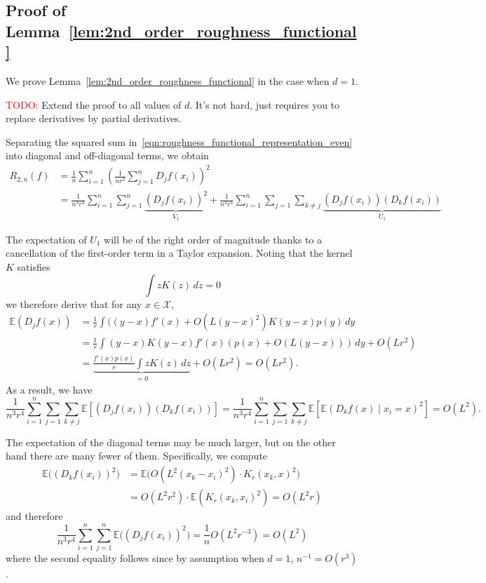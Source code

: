 \documentclass{article}
\newcommand{\1}{\mathbf{1}}
\newcommand{\Ebb}{\mathbb{E}}
\theoremstyle{alden}
\theoremstyle{aldenthm}
\theoremstyle{definition}
\theoremstyle{remark}
\begin{document}
\subsection{Proof of Lemma~\ref{lem:2nd_order_roughness_functional}}
We prove Lemma~\ref{lem:2nd_order_roughness_functional} in the case when $d = 1$.

\textcolor{red}{TODO:} Extend the proof to all values of $d$. It's not hard, just requires you to replace derivatives by partial derivatives.

Separating the squared sum in~\eqref{eqn:roughness_functional_representation_even} into diagonal and off-diagonal terms, we obtain
\begin{align*}
R_{2,n}(f) & = \frac{1}{n}\sum_{i = 1}^{n}\left(\frac{1}{nr^2}\sum_{j = 1}^{n} D_jf(x_i)\right)^2 \\
& = \frac{1}{n^3r^4}\sum_{i = 1}^{n} \sum_{j = 1}^{n}\underbrace{(D_jf(x_i))^2}_{V_1} + \frac{1}{n^3r^4}\sum_{i = 1}^{n} \sum_{j = 1} \sum_{k \neq j}\underbrace{(D_jf(x_i))(D_kf(x_i))}_{U_1}
\end{align*}

The expectation of $U_1$ will be of the right order of magnitude thanks to a cancellation of the first-order term in a Taylor expansion. Noting that the kernel $K$ satisfies
\begin{equation*}
\int z K(z) \,dz = 0
\end{equation*}
we therefore derive that for any $x \in \mathcal{X}$,
\begin{align*}
\mathbb{E}(D_jf(x)) & = \frac{1}{r}\int ((y - x)f'(x) + O(L(y-x)^2) K(y - x) p(y) \,dy \tag{by $f \in C^2(L)$} \\
& = \frac{1}{r}\int(y - x)K(y - x)f'(x)(p(x) + O(L(y - x))) \,dy + O(Lr^2)  \tag{by $p \in C^1(L)$}\\
& = \underbrace{\frac{f'(x) p(x)}{r} \int z K(z) \,dz}_{= 0} + O(Lr^2) = O(Lr^2).
\end{align*}
As a result, we have
\begin{equation*}
\frac{1}{n^3r^4}\sum_{i = 1}^{n} \sum_{j = 1} \sum_{k \neq j} \Ebb\left[(D_jf(x_i))(D_kf(x_i))\right] = \frac{1}{n^3r^4}\sum_{i = 1}^{n} \sum_{j = 1} \sum_{k \neq j} \Ebb\left[ \Ebb(D_kf(x)\mid x_i = x)^2\right] = O(L^2).
\end{equation*}

The expectation of the diagonal terms may be much larger, but on the other hand there are many fewer of them. Specifically, we compute
\begin{align*}
\Ebb\bigl((D_kf(x_i))^2\bigr) & = \Ebb\biggl(O\left(L^2(x_k - x_i)^2\right)\cdot K_r(x_k,x)^2\biggr) \\
& = O(L^2r^2)\cdot\Ebb(K_r(x_k,x_i)^2) = O(L^2 r)
\end{align*}
and therefore
\begin{equation*}
\frac{1}{n^3r^4}\sum_{i = 1}^{n} \sum_{j = 1}^{n} \Ebb\bigl((D_jf(x_i))^2\bigr) = \frac{1}{n} O(L^2 r^{-3}) = O(L^2)
\end{equation*}
where the second equality follows since by assumption when $d = 1$, $n^{-1} = O(r^{3})$. 
\end{document}
